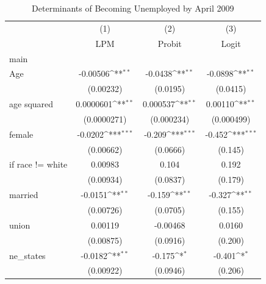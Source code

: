 \begin{table}[htbp]\centering
\def\sym#1{\ifmmode^{#1}\else\(^{#1}\)\fi}
\caption{Determinants of Becoming Unemployed by April 2009\label{tab:prob1-unemp}}
\footnotesize
\renewcommand{\arraystretch}{0.9}
\begin{tabular}{l*{3}{c}}
\toprule
                    &\multicolumn{1}{c}{(1)}&\multicolumn{1}{c}{(2)}&\multicolumn{1}{c}{(3)}\\
                    &\multicolumn{1}{c}{LPM}&\multicolumn{1}{c}{Probit}&\multicolumn{1}{c}{Logit}\\
\midrule
main                &                     &                     &                     \\
Age                 &    -0.00506\sym{**} &     -0.0438\sym{**} &     -0.0898\sym{**} \\
                    &   (0.00232)         &    (0.0195)         &    (0.0415)         \\
\addlinespace
age squared         &   0.0000601\sym{**} &    0.000537\sym{**} &     0.00110\sym{**} \\
                    & (0.0000271)         &  (0.000234)         &  (0.000499)         \\
\addlinespace
female              &     -0.0202\sym{***}&      -0.209\sym{***}&      -0.452\sym{***}\\
                    &   (0.00662)         &    (0.0666)         &     (0.145)         \\
\addlinespace
=1 if race != white &     0.00983         &       0.104         &       0.192         \\
                    &   (0.00934)         &    (0.0837)         &     (0.179)         \\
\addlinespace
married             &     -0.0151\sym{**} &      -0.159\sym{**} &      -0.327\sym{**} \\
                    &   (0.00726)         &    (0.0705)         &     (0.155)         \\
\addlinespace
union               &     0.00119         &    -0.00468         &      0.0160         \\
                    &   (0.00875)         &    (0.0916)         &     (0.200)         \\
\addlinespace
ne\_states           &     -0.0182\sym{**} &      -0.175\sym{*}  &      -0.401\sym{*}  \\
                    &   (0.00922)         &    (0.0946)         &     (0.206)         \\

\end{tabular}
\end{table}
